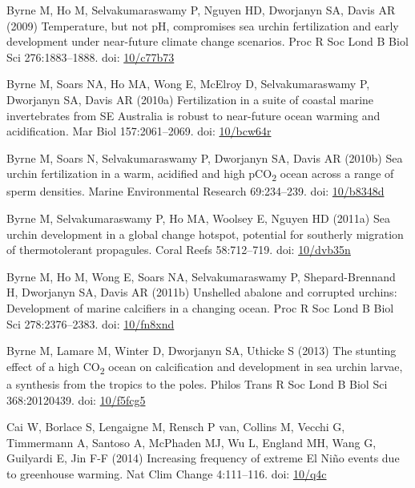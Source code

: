 \documentclass[a4paper,10pt, oneside]{memoir}
\begin{document}
\leavevmode\hypertarget{ref-Byrne2009}{}%
Byrne M, Ho M, Selvakumaraswamy P, Nguyen HD, Dworjanyn SA, Davis AR (2009) Temperature, but not pH, compromises sea urchin fertilization and early development under near-future climate change scenarios. Proc R Soc Lond B Biol Sci 276:1883--1888. doi: \href{https://doi.org/10/c77b73}{10/c77b73}

\leavevmode\hypertarget{ref-Byrne2010}{}%
Byrne M, Soars NA, Ho MA, Wong E, McElroy D, Selvakumaraswamy P, Dworjanyn SA, Davis AR (2010a) Fertilization in a suite of coastal marine invertebrates from SE Australia is robust to near-future ocean warming and acidification. Mar Biol 157:2061--2069. doi: \href{https://doi.org/10/bcw64r}{10/bcw64r}

\leavevmode\hypertarget{ref-Byrne2010a}{}%
Byrne M, Soars N, Selvakumaraswamy P, Dworjanyn SA, Davis AR (2010b) Sea urchin fertilization in a warm, acidified and high pCO\textsubscript{2} ocean across a range of sperm densities. Marine Environmental Research 69:234--239. doi: \href{https://doi.org/10/b8348d}{10/b8348d}

\leavevmode\hypertarget{ref-Byrne2011}{}%
Byrne M, Selvakumaraswamy P, Ho MA, Woolsey E, Nguyen HD (2011a) Sea urchin development in a global change hotspot, potential for southerly migration of thermotolerant propagules. Coral Reefs 58:712--719. doi: \href{https://doi.org/10/dvb35n}{10/dvb35n}

\leavevmode\hypertarget{ref-Byrne2011a}{}%
Byrne M, Ho M, Wong E, Soars NA, Selvakumaraswamy P, Shepard-Brennand H, Dworjanyn SA, Davis AR (2011b) Unshelled abalone and corrupted urchins: Development of marine calcifiers in a changing ocean. Proc R Soc Lond B Biol Sci 278:2376--2383. doi: \href{https://doi.org/10/fn8xnd}{10/fn8xnd}

\leavevmode\hypertarget{ref-Byrne2013}{}%
Byrne M, Lamare M, Winter D, Dworjanyn SA, Uthicke S (2013) The stunting effect of a high CO\textsubscript{2} ocean on calcification and development in sea urchin larvae, a synthesis from the tropics to the poles. Philos Trans R Soc Lond B Biol Sci 368:20120439. doi: \href{https://doi.org/10/f5fcg5}{10/f5fcg5}

\leavevmode\hypertarget{ref-Cai2014}{}%
Cai W, Borlace S, Lengaigne M, Rensch P van, Collins M, Vecchi G, Timmermann A, Santoso A, McPhaden MJ, Wu L, England MH, Wang G, Guilyardi E, Jin F-F (2014) Increasing frequency of extreme El Niño events due to greenhouse warming. Nat Clim Change 4:111--116. doi: \href{https://doi.org/10/q4c}{10/q4c}
\end{document}
